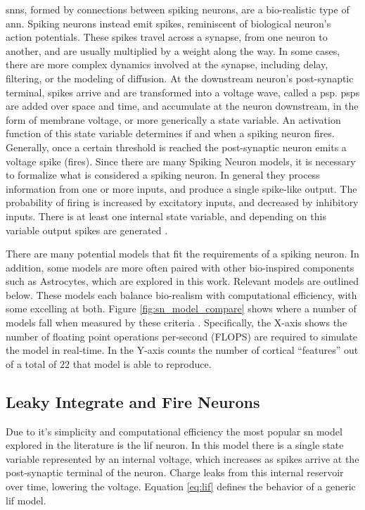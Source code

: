     \Glspl{snn}, formed by connections between spiking neurons, are a
    bio-realistic type of \gls{ann}. Spiking neurons instead emit spikes,
    reminiscent of biological neuron's action potentials. These spikes travel
    across a synapse, from one neuron to another, and are usually multiplied by
    a weight along the way. In some cases, there are more complex dynamics
    involved at the synapse, including delay, filtering, or the modeling of
    diffusion. At the downstream neuron's post-synaptic terminal, spikes arrive
    and are transformed into a voltage wave, called a \Gls{psp}. \Glspl{psp} are
    added over space and time, and accumulate at the neuron downstream, in the
    form of membrane voltage, or more generically a state variable. An
    activation function of this state variable determines if and when a spiking
    neuron fires. Generally, once a certain threshold is reached the
    post-synaptic neuron emits a voltage spike (fires). Since there are many
    Spiking Neuron models, it is necessary to formalize what is considered a
    spiking neuron. In general they process information from one or more inputs,
    and produce a single spike-like output. The probability of firing is
    increased by excitatory inputs, and decreased by inhibitory inputs. There is
    at least one internal state variable, and depending on this variable output
    spikes are generated \parencite{ponulak_2011}.
    
    There are many potential models that fit the requirements of a spiking
    neuron. In addition, some models are more often paired with other
    bio-inspired components such as Astrocytes, which are explored in this
    work. Relevant models are outlined below. These models each balance
    bio-realism with computational efficiency, with some excelling at
    both. Figure \ref{fig:sn_model_compare} shows where a number of models fall
    when measured by these criteria \cite{izhikevich_2004}. Specifically, the
    X-axis shows the number of floating point operations per-second (FLOPS) are
    required to simulate the model in real-time. In the Y-axis counts the number
    of cortical ``features'' out of a total of $22$ that model is able to
    reproduce.
    

    \subsection{Leaky Integrate and Fire Neurons}
    Due to it's simplicity and computational efficiency the most popular
    \gls{sn} model explored in the literature is the \Gls{lif} neuron. In this
    model there is a single state variable represented by an internal voltage,
    which increases as spikes arrive at the post-synaptic terminal of the
    neuron. Charge leaks from this internal reservoir over time, lowering the
    voltage. Equation \ref{eq:lif} defines the behavior of a generic \gls{lif} model.


